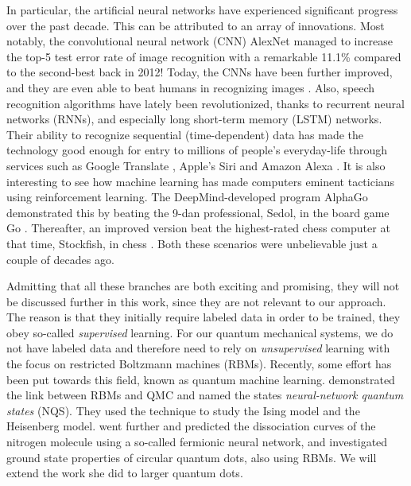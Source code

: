 In particular, the artificial neural networks have experienced significant progress over the past decade. This can be attributed to an array of innovations. Most notably, the convolutional neural network (CNN) AlexNet \supercite{krizhevsky_imagenet_2012} managed to increase the top-5 test error rate of image recognition with a remarkable 11.1\% compared to the second-best back in 2012! Today, the CNNs have been further improved, and they are even able to beat humans in recognizing images \supercite{alom_history_2018}. Also, speech recognition algorithms have lately been revolutionized, thanks to recurrent neural networks (RNNs), and especially long short-term memory (LSTM) networks. Their ability to recognize sequential (time-dependent) data has made the technology good enough for entry to millions of people's everyday-life through services such as Google Translate \supercite{wu_googles_2016}, Apple's Siri \supercite{smith_ios_2016} and Amazon Alexa \supercite{noauthor_bringing_nodate}. It is also interesting to see how machine learning has made computers eminent tacticians using reinforcement learning. The DeepMind-developed program AlphaGo demonstrated this by beating the 9-dan professional, Sedol, in the board game Go \supercite{silver2016mastering}. Thereafter, an improved version beat the highest-rated chess computer at that time, Stockfish, in chess \supercite{silver2017mastering}. Both these scenarios were unbelievable just a couple of decades ago.

Admitting that all these branches are both exciting and promising, they will not be discussed further in this work, since they are not relevant to our approach. The reason is that they initially require labeled data in order to be trained, they obey so-called \textit{supervised} learning. For our quantum mechanical systems, we do not have labeled data and therefore need to rely on \textit{unsupervised} learning with the focus on restricted Boltzmann machines (RBMs). Recently, some effort has been put towards this field, known as quantum machine learning. \citet{carleo_solving_2017} demonstrated the link between RBMs and QMC and named the states \textit{neural-network quantum states} (NQS). They used the technique to study the Ising model and the Heisenberg model. \citet{pfau2019abinitio} went further and predicted the dissociation curves of the nitrogen molecule using a so-called fermionic neural network, and \citet{flugsrud_vilde_moe_solving_nodate} investigated ground state properties of circular quantum dots, also using RBMs. We will extend the work she did to larger quantum dots.

